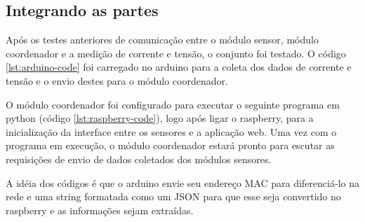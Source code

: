 \subsection{Integrando as partes}

Após os testes anteriores de comunicação entre o módulo sensor, módulo coordenador e a medição de corrente e tensão, o conjunto foi testado. O código \ref{lst:arduino-code} foi carregado no arduino para a coleta dos dados de corrente e tensão e o envio destes para o módulo coordenador.



O módulo coordenador foi configurado para executar o seguinte programa em python (código \ref{lst:raspberry-code}), logo após ligar o raspberry, para a inicialização da interface entre os sensores e a aplicação web. Uma vez com o programa em execução, o módulo coordenador estará pronto para escutar as requisições de envio de dados coletados dos módulos sensores. 



A idéia dos códigos é que o arduino envie seu endereço MAC para diferenciá-lo na rede e uma string formatada como um JSON para que esse seja convertido no raspberry e as informações sejam extraídas.
